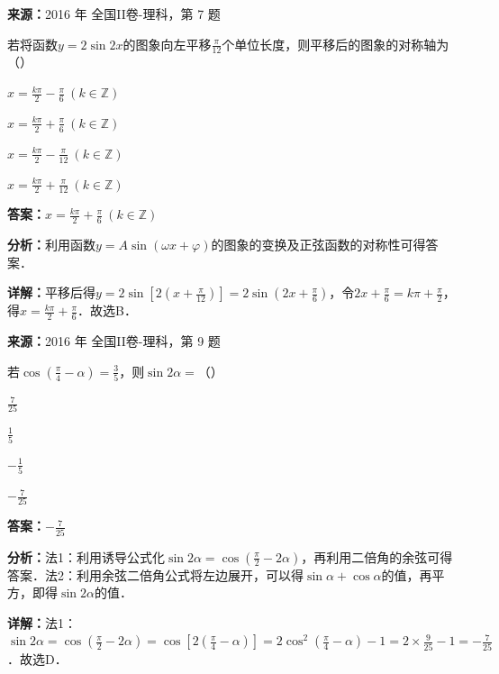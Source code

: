 \begin{question}[points=5]
\textbf{来源：}2016 年 全国II卷-理科，第 7 题\par
若将函数$y=2\sin2x$的图象向左平移$\frac{\pi}{12}$个单位长度，则平移后的图象的对称轴为（\quad）
\begin{choices}
  \item $x=\frac{k\pi}{2}-\frac{\pi}{6}\ (k\in\mathbb{Z})$
  \item $x=\frac{k\pi}{2}+\frac{\pi}{6}\ (k\in\mathbb{Z})$
  \item $x=\frac{k\pi}{2}-\frac{\pi}{12}\ (k\in\mathbb{Z})$
  \item $x=\frac{k\pi}{2}+\frac{\pi}{12}\ (k\in\mathbb{Z})$
\end{choices}
\begin{solution}
\textbf{答案：}$x=\frac{k\pi}{2}+\frac{\pi}{6}\ (k\in\mathbb{Z})$

\textbf{分析：}利用函数$y=A\sin(\omega x+\varphi)$的图象的变换及正弦函数的对称性可得答案．

\textbf{详解：}平移后得$y=2\sin\left[2\left(x+\frac{\pi}{12}\right)\right]=2\sin\left(2x+\frac{\pi}{6}\right)$，令$2x+\frac{\pi}{6}=k\pi+\frac{\pi}{2}$，得$x=\frac{k\pi}{2}+\frac{\pi}{6}$．故选B．
\end{solution}
\end{question}

\begin{question}[points=5]
\textbf{来源：}2016 年 全国II卷-理科，第 9 题\par
若$\cos\left(\frac{\pi}{4}-\alpha\right)=\frac{3}{5}$，则$\sin2\alpha=$（\quad）
\begin{choices}
  \item $\frac{7}{25}$
  \item $\frac{1}{5}$
  \item $-\frac{1}{5}$
  \item $-\frac{7}{25}$
\end{choices}
\begin{solution}
\textbf{答案：}$-\frac{7}{25}$

\textbf{分析：}法1：利用诱导公式化$\sin2\alpha=\cos\left(\frac{\pi}{2}-2\alpha\right)$，再利用二倍角的余弦可得答案．法2：利用余弦二倍角公式将左边展开，可以得$\sin\alpha+\cos\alpha$的值，再平方，即得$\sin2\alpha$的值．

\textbf{详解：}法1：$\sin2\alpha=\cos\left(\frac{\pi}{2}-2\alpha\right)=\cos\left[2\left(\frac{\pi}{4}-\alpha\right)\right]=2\cos^2\left(\frac{\pi}{4}-\alpha\right)-1=2\times\frac{9}{25}-1=-\frac{7}{25}$．故选D．
\end{solution}
\end{question}

